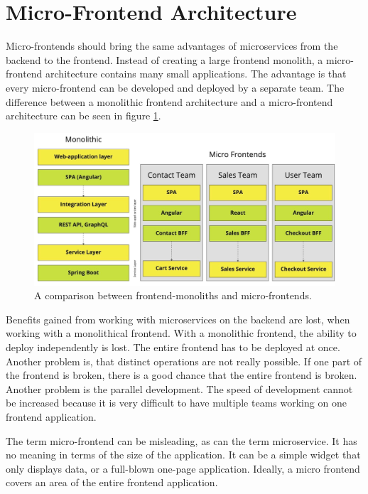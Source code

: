 \section{Micro-Frontend Architecture}\label{section:background:micro-frontend-architecture}

Micro-frontends should bring the same advantages of microservices from the backend to the frontend. Instead of creating a large frontend monolith, a micro-frontend architecture contains many small applications. The advantage is that every micro-frontend can be developed and deployed by a separate team. \cite{book:2020:geers:background:micro-frontends:micro-frontends-in-action} The difference between a monolithic frontend architecture and a micro-frontend architecture can be seen in figure \ref{fig:state-of-the-art:ui-monolith-micro-frontend}.

\ifshowImages
\begin{figure}[H]
    \centering
    \includegraphics[width=0.8\linewidth]{images/ui-monolith-micro-frontends.jpeg}
    \caption{A comparison between frontend-monoliths and micro-frontends.}\label{fig:state-of-the-art:ui-monolith-micro-frontend}
\end{figure}
\fi

\noindent Benefits gained from working with microservices on the backend are lost, when working with a monolithical frontend. With a monolithic frontend, the ability to deploy independently is lost. The entire frontend has to be deployed at once. Another problem is, that distinct operations are not really possible. If one part of the frontend is broken, there is a good chance that the entire frontend is broken. Another problem is the parallel development. The speed of development cannot be increased because it is very difficult to have multiple teams working on one frontend application. \cite{misc:2019:leitner:background:micro-frontends:micro-frontends-basics}

\bigskip

\noindent The term micro-frontend can be misleading, as can the term microservice. It has no meaning in terms of the size of the application. It can be a simple widget that only displays data, or a full-blown one-page application. Ideally, a micro frontend covers an area of the entire frontend application.

